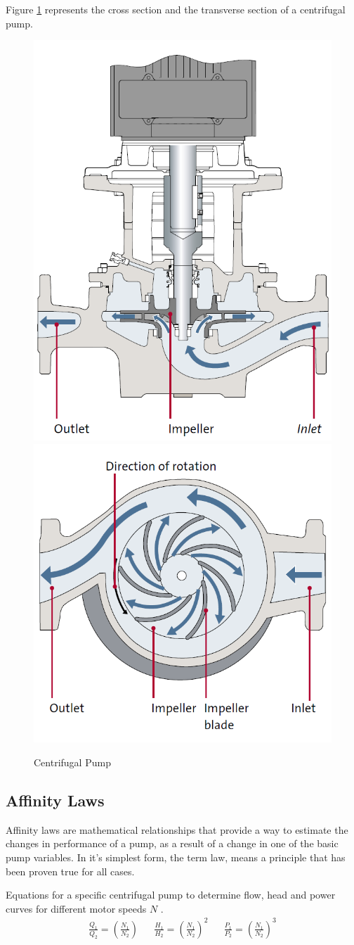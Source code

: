 \newpage
Figure \ref{fig:pump_sections} represents the cross section and the transverse section of a centrifugal pump.
\begin{figure}[h]
    \centering
    \includegraphics[width=0.4\linewidth]{figures/pump_cross_section.PNG}
    \qquad
    \hfill
    \includegraphics[width=0.4\linewidth]{figures/pump_above_view.PNG}
    \caption{Centrifugal Pump}
    \label{fig:pump_sections}
\end{figure}

\subsection{Affinity Laws}
Affinity laws are mathematical relationships that provide a way to estimate the changes in performance of a pump, 
as a result of a change in one of the basic pump variables.
In it's simplest form, the term law, means a principle that has been proven true for all cases.

Equations for a specific centrifugal pump to determine flow, head and power curves for different motor speeds $N$ \cite{Volk2014}.
\begin{align*}
	\frac{Q_1}{Q_2} = \left(\frac{N_1}{N_2}\right)   &&
	\frac{H_1}{H_2} = \left(\frac{N_1}{N_2}\right)^2 &&
	\frac{P_1}{P_2} = \left(\frac{N_1}{N_2}\right)^3	
\end{align*} 

